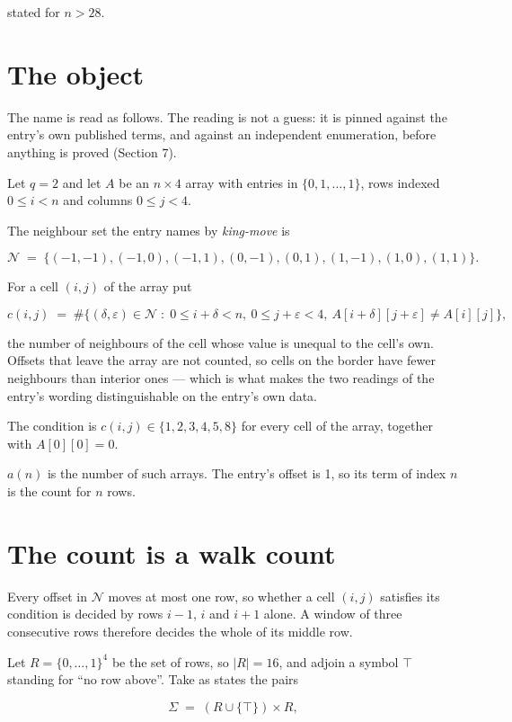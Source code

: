 \documentclass[11pt]{article}
\theoremstyle{definition}
\begin{document}
stated for $n > 28$.

\section{The object}

The name is read as follows. The reading is not a guess: it is pinned against the entry's own published terms, and against an independent enumeration, before anything is proved (Section 7).

Let $q = 2$ and let $A$ be an $n \times 4$ array with entries in $\{0,1,\dots,1\}$, rows indexed $0 \le i < n$ and columns $0 \le j < 4$.

The neighbour set the entry names by {\itshape king-move} is

\[\mathcal{N} \;=\; \{(-1,-1), (-1,0), (-1,1), (0,-1), (0,1), (1,-1), (1,0), (1,1)\}.\]

For a cell $(i,j)$ of the array put

\[c(i,j) \;=\; \#\bigl\{(\delta,\varepsilon)\in\mathcal{N} \;:\; 0\le i+\delta<n,\ 0\le j+\varepsilon<4,\ A[i+\delta][j+\varepsilon] \neq A[i][j]\bigr\},\]

the number of neighbours of the cell whose value is unequal to the cell's own. Offsets that leave the array are not counted, so cells on the border have fewer neighbours than interior ones --- which is what makes the two readings of the entry's wording distinguishable on the entry's own data.

The condition is $c(i,j) \in \{1, 2, 3, 4, 5, 8\}$ for every cell of the array, together with $A[0][0]=0$.

$a(n)$ is the number of such arrays. The entry's offset is 1, so its term of index $n$ is the count for $n$ rows.

\section{The count is a walk count}

Every offset in $\mathcal{N}$ moves at most one row, so whether a cell $(i,j)$ satisfies its condition is decided by rows $i-1$, $i$ and $i+1$ alone. A window of three consecutive rows therefore decides the whole of its middle row.

Let $R = \{0,\dots,1\}^{4}$ be the set of rows, so $|R| = 16$, and adjoin a symbol $\top$ standing for ``no row above''. Take as states the pairs

\[\Sigma \;=\; (R \cup \{\top\}) \times R,\]
\end{document}
